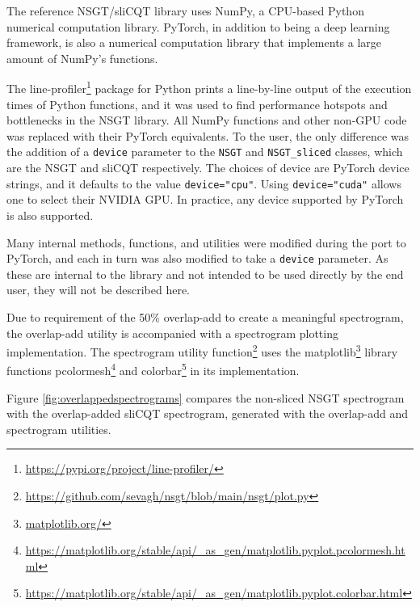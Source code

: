 \documentclass[report.tex]{subfiles}
\begin{document}
The reference NSGT/sliCQT library uses NumPy, a CPU-based Python numerical computation library. PyTorch, in addition to being a deep learning framework, is also a numerical computation library that implements a large amount of NumPy's functions.

The line-profiler\footnote{\url{https://pypi.org/project/line-profiler/}} package for Python prints a line-by-line output of the execution times of Python functions, and it was used to find performance hotspots and bottlenecks in the NSGT library. All NumPy functions and other non-GPU code was replaced with their PyTorch equivalents. To the user, the only difference was the addition of a \Verb#device# parameter to the \Verb#NSGT# and \Verb#NSGT_sliced# classes, which are the NSGT and sliCQT respectively. The choices of device are PyTorch device strings, and it defaults to the value \Verb#device="cpu"#. Using \Verb#device="cuda"# allows one to select their NVIDIA GPU. In practice, any device supported by PyTorch is also supported.

Many internal methods, functions, and utilities were modified during the port to PyTorch, and each in turn was also modified to take a \Verb#device# parameter. As these are internal to the library and not intended to be used directly by the end user, they will not be described here.

Due to requirement of the 50\% overlap-add to create a meaningful spectrogram, the overlap-add utility is accompanied with a spectrogram plotting implementation.  The spectrogram utility function\footnote{\url{https://github.com/sevagh/nsgt/blob/main/nsgt/plot.py}} uses the matplotlib\footnote{\url{matplotlib.org/}} library functions pcolormesh\footnote{\url{https://matplotlib.org/stable/api/_as_gen/matplotlib.pyplot.pcolormesh.html}} and colorbar\footnote{\url{https://matplotlib.org/stable/api/_as_gen/matplotlib.pyplot.colorbar.html}} in its implementation.

Figure \ref{fig:overlappedspectrograms} compares the non-sliced NSGT spectrogram with the overlap-added sliCQT spectrogram, generated with the overlap-add and spectrogram utilities.
\end{document}
